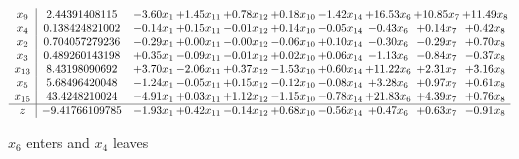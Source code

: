 \documentclass[9pt]{article}
\begin{document}
 \[\begin{array}{c| c c@{\hskip 2pt} c@{\hskip 2pt} c@{\hskip 2pt} c@{\hskip 2pt} c@{\hskip 2pt} c@{\hskip 2pt} c@{\hskip 2pt} c@{\hskip 2pt} }
 x_{9}   &  2.44391408115 & -3.60 x_{1} & +  1.45 x_{11} & +  0.78 x_{12} & +  0.18 x_{10} & -1.42 x_{14} & + 16.53 x_{6} & + 10.85 x_{7} & + 11.49 x_{8}\\
 x_{4}   &  0.138424821002 & -0.14 x_{1} & +  0.15 x_{11} & -0.01 x_{12} & +  0.14 x_{10} & -0.05 x_{14} & -0.43 x_{6} & +  0.14 x_{7} & +  0.42 x_{8}\\
 x_{2}   &  0.704057279236 & -0.29 x_{1} & +  0.00 x_{11} & -0.00 x_{12} & -0.06 x_{10} & +  0.10 x_{14} & -0.30 x_{6} & -0.29 x_{7} & +  0.70 x_{8}\\
 x_{3}   &  0.489260143198 & +  0.35 x_{1} & -0.09 x_{11} & -0.01 x_{12} & +  0.02 x_{10} & +  0.06 x_{14} & -1.13 x_{6} & -0.84 x_{7} & -0.37 x_{8}\\
 x_{13}   &  8.43198090692 & +  3.70 x_{1} & -2.06 x_{11} & +  0.37 x_{12} & -1.53 x_{10} & +  0.60 x_{14} & + 11.22 x_{6} & +  2.31 x_{7} & +  3.16 x_{8}\\
 x_{5}   &  5.68496420048 & -1.24 x_{1} & -0.05 x_{11} & +  0.15 x_{12} & -0.12 x_{10} & -0.08 x_{14} & +  3.28 x_{6} & +  0.97 x_{7} & +  0.61 x_{8}\\
 x_{15}   &  43.4248210024 & -4.91 x_{1} & +  0.03 x_{11} & +  1.12 x_{12} & -1.15 x_{10} & -0.78 x_{14} & + 21.83 x_{6} & +  4.39 x_{7} & +  0.76 x_{8}\\
\hline
z    &  -9.41766109785 & -1.93 x_{1} & +  0.42 x_{11} & -0.14 x_{12} & +  0.68 x_{10} & -0.56 x_{14} & +  0.47 x_{6} & +  0.63 x_{7} & -0.91 x_{8}\\
\end{array}\]


 $ x_{6} $ enters and $ x_{4} $ leaves 
\end{document}
